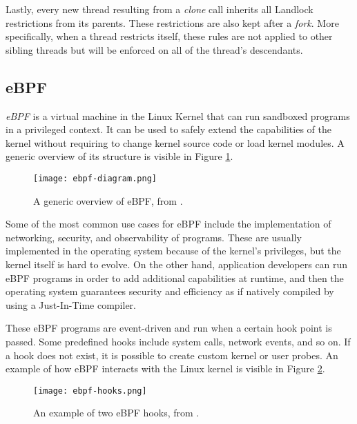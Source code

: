 Lastly, every new thread resulting from a \textit{clone} call inherits all Landlock restrictions from its parents.
These restrictions are also kept after a \textit{fork}.
More specifically, when a thread restricts itself, these rules are not applied to other sibling threads
but will be enforced on all of the thread's descendants.

\subsection{eBPF}
\textit{eBPF} \cite{ebpf} is a virtual machine in the Linux Kernel that can run sandboxed programs
in a privileged context. It can be used to safely extend the capabilities of the kernel
without requiring to change kernel source code or load kernel modules. A generic overview of its structure
is visible in Figure \ref{fig:ebpf-generic-overview}.

\begin{figure}[ht]
  \centering
  \texttt{[image: ebpf-diagram.png]}
  \caption{A generic overview of eBPF, from \cite{ebpf}.}
  \label{fig:ebpf-generic-overview}
\end{figure}

Some of the most common use cases for eBPF include the implementation of networking, security, and
observability of programs. These are usually implemented in the operating system because of the kernel's
privileges, but the kernel itself is hard to evolve.
On the other hand, application developers can run eBPF programs in order to add additional capabilities at runtime,
and then the operating system guarantees security and efficiency as if natively compiled
by using a Just-In-Time compiler.

These eBPF programs are event-driven and run when a certain hook point is passed. Some
predefined hooks include system calls, network events, and so on. If a hook does not exist,
it is possible to create custom kernel or user probes. An example of how eBPF interacts with the
Linux kernel is visible in Figure \ref{fig:example-ebpf-hooks}.

\begin{figure}[ht]
  \centering
  \texttt{[image: ebpf-hooks.png]}
  \caption{An example of two eBPF hooks, from \cite{ebpf-description}.}
  \label{fig:example-ebpf-hooks}
\end{figure}

